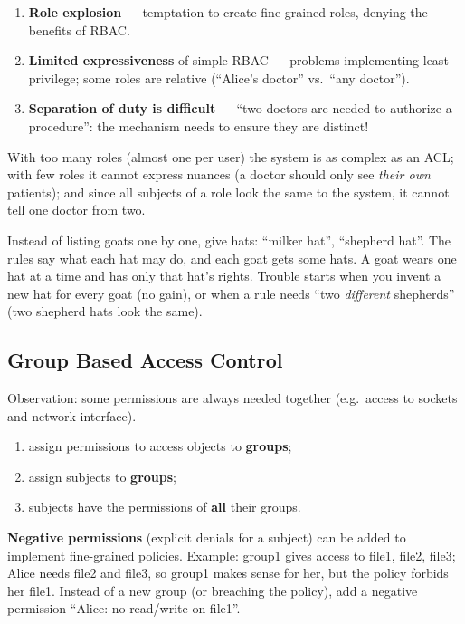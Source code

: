 \begin{warnbox}[title=RBAC problems]
\begin{enumerate}
  \item \textbf{Role explosion} --- temptation to create fine-grained roles, denying the
        benefits of RBAC.
  \item \textbf{Limited expressiveness} of simple RBAC --- problems implementing least
        privilege; some roles are relative (``Alice's doctor'' vs.\ ``any doctor'').
  \item \textbf{Separation of duty is difficult} --- ``two doctors are needed to
        authorize a procedure'': the mechanism needs to ensure they are distinct!
\end{enumerate}
With too many roles (almost one per user) the system is as complex as an ACL; with few roles it
cannot express nuances (a doctor should only see \emph{their own} patients); and since all
subjects of a role look the same to the system, it cannot tell one doctor from two.
\end{warnbox}

\begin{goatbox}
Instead of listing goats one by one, give hats: ``milker hat'', ``shepherd hat''. The rules say
what each hat may do, and each goat gets some hats. A goat wears one hat at a time and has only
that hat's rights. Trouble starts when you invent a new hat for every goat (no gain), or when a
rule needs ``two \emph{different} shepherds'' (two shepherd hats look the same).
\end{goatbox}

\subsection{Group Based Access Control}

\begin{defnbox}[title=Group Based Access Control]
Observation: some permissions are always needed together (e.g.\ access to sockets and
network interface).
\begin{enumerate}
  \item assign permissions to access objects to \textbf{groups};
  \item assign subjects to \textbf{groups};
  \item subjects have the permissions of \textbf{all} their groups.
\end{enumerate}
\textbf{Negative permissions} (explicit denials for a subject) can be added to implement
fine-grained policies. Example: group1 gives access to file1, file2, file3; Alice needs file2 and
file3, so group1 makes sense for her, but the policy forbids her file1. Instead of a new group
(or breaching the policy), add a negative permission ``Alice: no read/write on file1''.
\end{defnbox}


